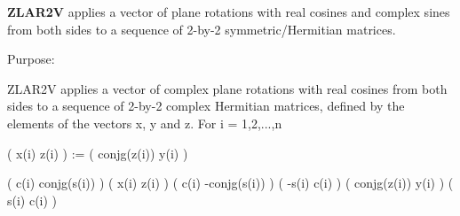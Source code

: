 {\bfseries Z\+L\+A\+R2\+V} applies a vector of plane rotations with real cosines and complex sines from both sides to a sequence of 2-\/by-\/2 symmetric/\+Hermitian matrices. 

 \begin{DoxyParagraph}{Purpose\+: }
\begin{DoxyVerb} ZLAR2V applies a vector of complex plane rotations with real cosines
 from both sides to a sequence of 2-by-2 complex Hermitian matrices,
 defined by the elements of the vectors x, y and z. For i = 1,2,...,n

    (       x(i)  z(i) ) :=
    ( conjg(z(i)) y(i) )

      (  c(i) conjg(s(i)) ) (       x(i)  z(i) ) ( c(i) -conjg(s(i)) )
      ( -s(i)       c(i)  ) ( conjg(z(i)) y(i) ) ( s(i)        c(i)  )\end{DoxyVerb}
 
\end{DoxyParagraph}

